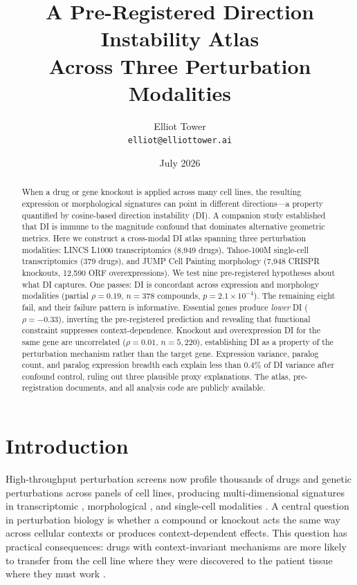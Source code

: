 \documentclass[11pt]{article}
\title{A Pre-Registered Direction Instability Atlas\\
Across Three Perturbation Modalities}
\author{Elliot Tower\\
\texttt{elliot@elliottower.ai}}
\date{July 2026}
\begin{document}
\maketitle

\begin{abstract}
When a drug or gene knockout is applied across many cell lines, the
resulting expression or morphological signatures can point in different
directions---a property quantified by cosine-based direction instability
(DI). A companion study established that DI is immune to the magnitude
confound that dominates alternative geometric metrics.  Here we construct a cross-modal DI atlas spanning three perturbation
modalities: LINCS L1000 transcriptomics (8{,}949 drugs), Tahoe-100M
single-cell transcriptomics (379 drugs), and JUMP Cell Painting
morphology (7{,}948 CRISPR knockouts, 12{,}590 ORF overexpressions).
We test nine pre-registered hypotheses about what DI captures. One passes: DI is
concordant across expression and morphology modalities (partial
$\rho = 0.19$, $n = 378$ compounds, $p = 2.1 \times 10^{-4}$).  The
remaining eight fail, and their failure pattern is informative.
Essential genes produce \emph{lower} DI ($\rho = -0.33$), inverting
the pre-registered prediction and revealing that functional constraint
suppresses context-dependence.  Knockout and overexpression DI for the
same gene are uncorrelated ($\rho = 0.01$, $n = 5{,}220$),
establishing DI as a property of the perturbation mechanism rather than
the target gene.  Expression variance, paralog count, and paralog
expression breadth each explain less than 0.4\% of DI variance after
confound control, ruling out three plausible proxy explanations.  The
atlas, pre-registration documents, and all analysis code are publicly
available.
\end{abstract}


\section{Introduction}

High-throughput perturbation screens now profile thousands of drugs and
genetic perturbations across panels of cell lines, producing
multi-dimensional signatures in transcriptomic
\citep{subramanian2017next}, morphological \citep{bray2016cell}, and
single-cell modalities \citep{tahoe2025}.  A central question in
perturbation biology is whether a compound or knockout acts the same way
across cellular contexts or produces context-dependent effects.  This
question has practical consequences: drugs with context-invariant
mechanisms are more likely to transfer from the cell line where they were
discovered to the patient tissue where they must work
\citep{tower2026confound}.
\end{document}
